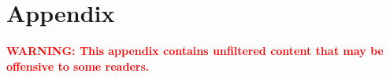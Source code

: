 \documentclass{article} %
\begin{document}





\newpage
\appendix
\section*{Appendix}
\textcolor{red}{\textbf{WARNING: This appendix contains unfiltered content that may be offensive to some readers.}}


\startcontents[appendix]
\clearpage

\newpage

\newpage

\newpage

\newpage

\newpage

\newpage

\newpage

\newpage

\newpage

\newpage

\clearpage
\newpage

\newpage

\newpage

\end{document}
